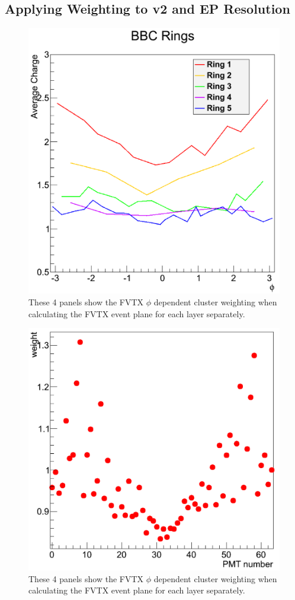 \subsection{Applying Weighting to v2 and EP Resolution}
\begin{figure}[h!]
\begin{center}
\includegraphics[width=0.55\linewidth]{figs/bbc_rings_average_ccharge.png}
\caption{These 4 panels show the FVTX $\phi$ dependent cluster weighting when calculating the FVTX event plane for each layer separately. }
\label{fig:diagram2}
\end{center}
\end{figure}
\begin{figure}[h!]
\begin{center}
\includegraphics[width=0.55\linewidth]{figs/pmt_ratio_weight.png}
\caption{These 4 panels show the FVTX $\phi$ dependent cluster weighting when calculating the FVTX event plane for each layer separately. }
\label{fig:diagram2}
\end{center}
\end{figure}

